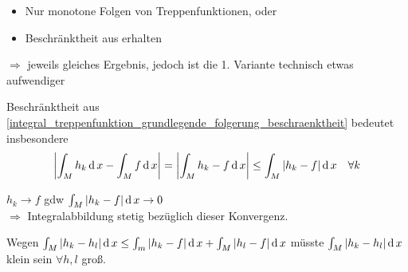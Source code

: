 \begin{underlinedenvironment}[Motivation]
	\hspace*{0pt}
	\begin{itemize}[topsep=\dimexpr -\baselineskip / 2\relax]
		\item Nur monotone Folgen von Treppenfunktionen, oder
		\item Beschränktheit aus  erhalten
	\end{itemize}
	$\Rightarrow$ jeweils gleiches Ergebnis, jedoch ist die 1. Variante technisch etwas aufwendiger
	
	Beschränktheit aus  \ref{integral_treppenfunktion_grundlegende_folgerung_beschraenktheit} bedeutet insbesondere \begin{align*}
		\left\vert \int_M h_k\operatorname{d} x - \int_M f \operatorname{d} x \right\vert = \left\vert \int_M h_k - f \operatorname{d} x \right\vert \le \int_M \vert h_k - f\vert \operatorname{d} x \quad\forall k
	\end{align*}
\end{underlinedenvironment}
\begin{underlinedenvironment}
	$h_k\to f$ \gls{gdw} $\int_M \vert h_k - f\vert \operatorname{d} x\to 0$\\
	$\Rightarrow$ Integralabbildung stetig bezüglich dieser Konvergenz.
	
	Wegen $\int_M \vert h_k - h_l\vert \operatorname{d} x \le \int_m \vert h_k - f\vert \operatorname{d} x + \int_M \vert h_l -f \vert \operatorname{d} x$ müsste $\int_M \vert h_k - h_l\vert \operatorname{d} x$ klein sein $\forall h,l$ groß.
\end{underlinedenvironment}

